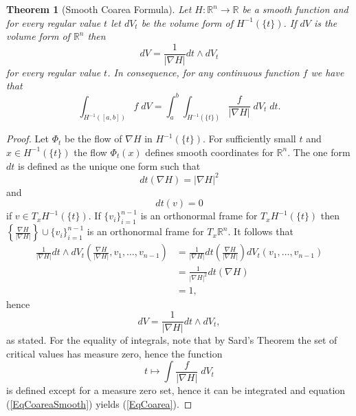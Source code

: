\documentclass[%
 aip,
 amsmath,amssymb,
 reprint,%
jmp]{revtex4-2}
\newtheorem{theorem}{Theorem}[section]
\begin{document}
\begin{theorem}[Smooth Coarea Formula]
Let $H\colon \mathbb{R}^{n} \to \mathbb{R}$ be a smooth function and for every regular value $t$ let $dV_{t}$ be the volume form of $H^{-1}(\{t\})$. If $dV$ is the volume form of $\mathbb{R}^{n}$ then
\begin{equation*}
    dV = \frac{1}{|\nabla H|} dt\wedge dV_{t}
\end{equation*}
for every regular value $t$. In consequence, for any continuous function $f$ we have that
\begin{equation}\label{EqCoarea}
    \int_{H^{-1}([a,b])} f\;dV = \int_{a}^{b}\int_{H^{-1}(\{t\})} \frac{f}{|\nabla H|}\;dV_{t}\;dt.
\end{equation}
\end{theorem}
\begin{proof}
Let $\Phi_{t}$ be the flow of $\nabla H$ in $H^{-1}(\{t\})$. For sufficiently small $t$ and $x\in H^{-1}(\{t\})$ the flow $\Phi_{t}(x)$ defines smooth coordinates for $\mathbb{R}^{n}$. The one form $dt$ is defined as the unique one form such that
\begin{equation*}
    dt(\nabla H) = |\nabla H|^{2}
\end{equation*}
and
\begin{equation*}
    dt(v) = 0
\end{equation*}
if $v\in T_{x}H^{-1}(\{t\})$. If $\{v_{i}\}_{i=1}^{n-1}$ is an orthonormal frame for $T_{x}H^{-1}(\{t\})$ then $\left\{\frac{\nabla H}{|\nabla H|}\right\}\cup \{v_{i}\}_{i=1}^{n-1}$ is an orthonormal frame for $T_{x}\mathbb{R}^{n}$. It follows that
\begin{align*}
    \frac{1}{|\nabla H|} dt\wedge dV_{t} \left(\frac{\nabla H}{|\nabla H|},v_{1},\ldots,v_{n-1}\right) &= \frac{1}{|\nabla H|}dt\left(\frac{\nabla H}{|\nabla H|}\right) dV_{t} (v_{1},\ldots,v_{n-1})\\
    &= \frac{1}{|\nabla H|^{2}}dt(\nabla H)\\
    &= 1,
\end{align*}
hence
\begin{equation}\label{EqCoareaSmooth}
    dV = \frac{1}{|\nabla H|} dt\wedge dV_{t},
\end{equation}
as stated. For the equality of integrals, note that by Sard's Theorem the set of critical values has measure zero, hence the function
\begin{equation*}
    t \longmapsto \int \frac{f}{|\nabla H|}\;dV_{t}
\end{equation*}
is defined except for a measure zero set, hence it can be integrated and equation (\ref{EqCoareaSmooth}) yields (\ref{EqCoarea}).
\end{proof}
\end{document}
